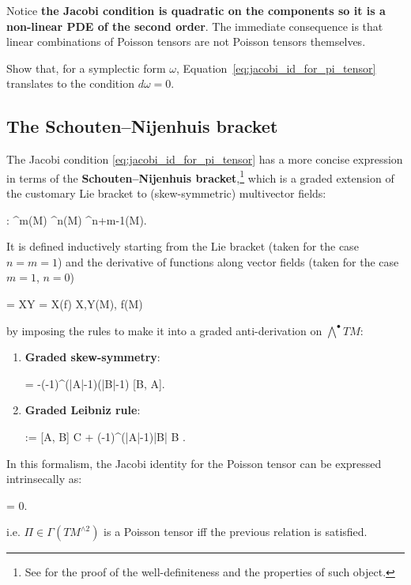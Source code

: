 \documentclass[main.tex]{subfiles}
\begin{document}
\begin{remark}
	Notice \textbf{the Jacobi condition is quadratic on the components so it is a non-linear PDE of the second order}. The immediate consequence is that linear combinations of Poisson tensors are not Poisson tensors themselves.
\end{remark}

\begin{exercise}
	Show that, for a symplectic form $\omega$, Equation~\eqref{eq:jacobi_id_for_pi_tensor} translates to the condition $d\omega = 0$.
\end{exercise}

\subsection{The Schouten--Nijenhuis bracket}
The Jacobi condition \eqref{eq:jacobi_id_for_pi_tensor} has a more concise expression in terms of the \textbf{Schouten--Nijenhuis bracket},\footnote{See \cite[Section 33.2]{michor2008} for the proof of the well-definiteness and the properties of such object.} which is a graded extension of the customary Lie bracket to (skew-symmetric) multivector fields:
\begin{eqalign}
	[\bullet, \bullet] : \Lambda^m(M) \times \Lambda^n(M) \longto \Lambda^{n+m-1}(M).
\end{eqalign}
It is defined inductively starting from the Lie bracket (taken for the case $n=m=1$) and the derivative of functions along vector fields (taken for the case $m=1$, $n=0$) 
\begin{eqalign}
	[X,Y] = \Lie XY \quad {} \quad [X, f] = X(f) \quad \forall X,Y\in\fields(M), f\in\Cinfty(M)
\end{eqalign}
by imposing the rules to make it into a graded anti-derivation on $\bigwedge^\bullet TM$:
\begin{enumerate}
	\item \textbf{Graded skew-symmetry}:
	\begin{eqalign}
		[A,B] = -(-1)^{(|A|-1)(|B|-1)} [B, A].
	\end{eqalign}
	\item \textbf{Graded Leibniz rule}:
	\begin{eqalign}
		[A,B \wedge C] := [A, B] \wedge C + (-1)^{(|A|-1)|B|} B \wedge [A,C].
	\end{eqalign}
\end{enumerate}

In this formalism, the Jacobi identity for the Poisson tensor can be expressed intrinsecally as:
\begin{eqalign}
	[\Pi, \Pi] = 0.
\end{eqalign}
i.e. $\Pi\in\Gamma(TM^{\wedge2})$ is a Poisson tensor iff the previous relation is satisfied.
\end{document}
